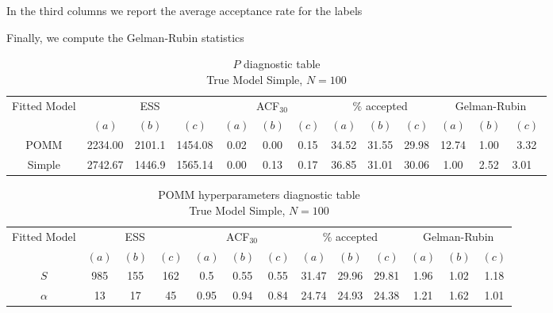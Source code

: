 \documentclass[11pt]{amsart}
\begin{document}
In the third columns we report the average acceptance rate for the labels

Finally, we compute the Gelman-Rubin statistics 

\begin{table}[h]
\centering
\caption{
{\large $P$ diagnostic table} \\ 
{\small True Model Simple, $N=100$}
} 
\begin{tabular}{ccccccccccccc}
\toprule
\multirow{2}{*}{Fitted Model} & \multicolumn{3}{c}{ESS} & \multicolumn{3}{c}{
ACF$_{30}$} & \multicolumn{3}{c}{$\%$ accepted} & \multicolumn{3}{c}{Gelman-Rubin}\\
\cmidrule(lr){2-4} \cmidrule(lr){5-7} \cmidrule(lr){8-10} \cmidrule(lr){11-13} 
& $(a)$ & $(b)$ & $(c)$ & $(a)$ & $(b)$ & $(c)$ & $(a)$ & $(b)$ & $(c)$ & $(a)$ & $(b)$ & $(c)$ \\
\midrule
POMM &2234.00 & 2101.1 & 1454.08 & 0.02 & 0.00 & 0.15 & 34.52 & 31.55 & 29.98 & 12.74 & 1.00 & 3.32  \\
Simple &2742.67 & 1446.9 & 1565.14 & 0.00 & 0.13 & 0.17 & 36.85 & 31.01 & 30.06 & 1.00 & 2.52 & 3.01 \ \\
\bottomrule
\end{tabular}
\label{table:P_diagnostics_Simple}
\end{table}


\begin{table}[h]
\centering
\caption{
{\large POMM hyperparameters diagnostic table} \\ 
{\small True Model Simple, $N=100$}
} 
\begin{tabular}{ccccccccccccc}
\toprule
\multirow{2}{*}{Fitted Model} & \multicolumn{3}{c}{ESS} & \multicolumn{3}{c}{
ACF$_{30}$} & \multicolumn{3}{c}{$\%$ accepted} & \multicolumn{3}{c}{Gelman-Rubin}\\
\cmidrule(lr){2-4} \cmidrule(lr){5-7} \cmidrule(lr){8-10} \cmidrule(lr){11-13} 
& $(a)$ & $(b)$ & $(c)$ & $(a)$ & $(b)$ & $(c)$ & $(a)$ & $(b)$ & $(c)$ & $(a)$ & $(b)$ & $(c)$ \\
\midrule
$S$ &985 & 155 & 162 & 0.5 & 0.55 & 0.55 & 31.47 & 29.96 & 29.81 & 1.96 & 1.02 & 1.18 \\
$\alpha$ &13 & 17 & 45 & 0.95 & 0.94 & 0.84 & 24.74 & 24.93 & 24.38 & 1.21 & 1.62 & 1.01 \\
\bottomrule
\end{tabular}
\label{table:P_diagnostics_Simple}
\end{table}

\clearpage
\end{document}
